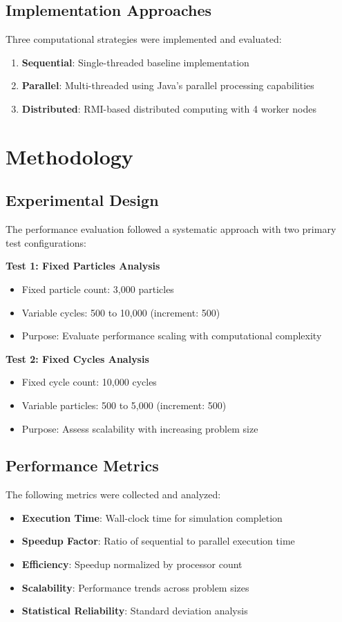 \documentclass[sigconf]{acmart}
\begin{document}
\subsection{Implementation Approaches}
Three computational strategies were implemented and evaluated:
\begin{enumerate}
    \item \textbf{Sequential}: Single-threaded baseline implementation
    \item \textbf{Parallel}: Multi-threaded using Java's parallel processing capabilities
    \item \textbf{Distributed}: RMI-based distributed computing with 4 worker nodes
\end{enumerate}

\section{Methodology}

\subsection{Experimental Design}
The performance evaluation followed a systematic approach with two primary test configurations:

\textbf{Test 1: Fixed Particles Analysis}
\begin{itemize}
    \item Fixed particle count: 3,000 particles
    \item Variable cycles: 500 to 10,000 (increment: 500)
    \item Purpose: Evaluate performance scaling with computational complexity
\end{itemize}

\textbf{Test 2: Fixed Cycles Analysis}
\begin{itemize}
    \item Fixed cycle count: 10,000 cycles
    \item Variable particles: 500 to 5,000 (increment: 500)
    \item Purpose: Assess scalability with increasing problem size
\end{itemize}

\subsection{Performance Metrics}
The following metrics were collected and analyzed:
\begin{itemize}
    \item \textbf{Execution Time}: Wall-clock time for simulation completion
    \item \textbf{Speedup Factor}: Ratio of sequential to parallel execution time
    \item \textbf{Efficiency}: Speedup normalized by processor count
    \item \textbf{Scalability}: Performance trends across problem sizes
    \item \textbf{Statistical Reliability}: Standard deviation analysis
\end{itemize}
\end{document}
